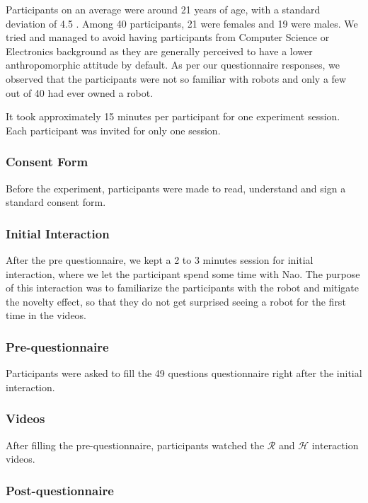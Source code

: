 \documentclass{acm_proc_article-sp}
\begin{document}
Participants on an average were around 21 years of age, with a standard
deviation of 4.5 . Among 40 participants, 21 were females and 19 were males.  We
tried and managed to avoid having participants from Computer Science or
Electronics background as they are generally perceived to have a lower
anthropomorphic attitude by default. As per our questionnaire responses, we
observed that the participants were not so familiar with robots and only a few
out of 40 had ever owned a robot.

It took approximately 15 minutes per participant for one experiment session.
Each participant was invited for only one session. 

\subsubsection{Consent Form}

Before the experiment, participants were made to read, understand and sign a
standard consent form.

\subsubsection{Initial Interaction}

After the pre questionnaire, we kept a 2 to 3 minutes session for initial
interaction, where we let the participant spend some time with Nao\cite{mc3}.
The purpose of this interaction was to familiarize the participants with the
robot and mitigate the novelty effect, so that they do not get surprised seeing
a robot for the first time in the videos.

\subsubsection{Pre-questionnaire}

Participants were asked to fill the 49 questions questionnaire right after the
initial interaction.

\subsubsection{Videos}

After filling the pre-questionnaire, participants watched the $\mathcal{R}$ and
$\mathcal{H}$ interaction videos.

\subsubsection{Post-questionnaire}
\end{document}
